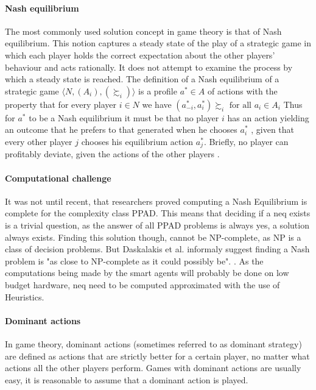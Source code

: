 \paragraph{Nash equilibrium} 
The most commonly used solution concept in game theory is that of Nash equilibrium. This notion captures a steady state of the play of a strategic game in which each player holds the correct expectation about the other players’ behaviour and acts rationally. It does not attempt to examine the process by which a steady state is reached.
The definition of a Nash equilibrium of a strategic game  $\langle N, (A_i), (\succsim_i) \rangle $ is a profile $a^{*} \in A$ of actions with the property that for every player $i \in N$ we have $(a^{*}_{-i}, a^{*}_{i}) \succsim_i \mbox{ for all } a_i \in A_i$ 
Thus for $a^*$ to be a Nash equilibrium it must be that no player $i$ has an action yielding an outcome that he prefers to that generated when he chooses $a_i^*$ , given that every other player $j$ chooses his equilibrium action $a^*_j$. Briefly, no player can profitably deviate, given the actions of the other players \cite{CourseInGameTheory}.


\paragraph{Computational challenge} 
It was not until recent, that researchers proved computing a Nash Equilibrium is complete for the complexity class PPAD\cite{daskalakis2009complexity}. This means that deciding if a \ac{neq} exists is a trivial question, as the answer of all PPAD problems is always yes, a solution always exists. Finding this solution though, cannot be NP-complete, as NP is a class of decision problems. But Daskalakis et al. informaly suggest finding a Nash problem is "as close to NP-complete as it could possibly be". \cite{daskalakis2009complexity, Aaronson2012}. 
As the computations being made by the smart agents will probably be done on low budget hardware, \ac{neq} need to be computed approximated with the use of Heuristics. \cite{MicrogridModellingPetrosAristidou,AumannGameTheoryAccomplish} 

\paragraph{Dominant actions}
In game theory, dominant actions (sometimes referred to as dominant strategy) are defined as actions that are strictly better for a certain player, no matter what actions all the other players perform. Games with dominant actions are usually easy, it is reasonable to assume that a dominant action is played. 

